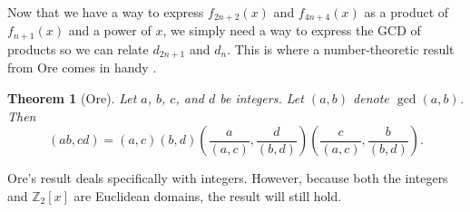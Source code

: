\documentclass[a4paper]{article}
\newtheorem{theorem}{Theorem}
\newcommand{\Z}{\mathbb{Z}}
\begin{document}
	Now that we have a way to express $f_{2n+2}(x)$ and $f_{4n+4}(x)$ as a product of $f_{n+1}(x)$ and a power of $x$, we simply need a way to express the GCD of products so we can relate $d_{2n+1}$ and $d_n$.
	This is where a number-theoretic result from Ore comes in handy \cite{ore_number_theory}.
	
	\begin{theorem}[Ore]\label{Ore_gcd}
		Let $a$, $b$, $c$, and $d$ be integers.
		Let $(a,b)$ denote $\gcd{(a,b)}$.
		Then
		\begin{equation*}
			(ab,cd) = (a,c)(b,d)\left(\frac{a}{(a,c)},\frac{d}{(b,d)}\right)\left(\frac{c}{(a,c)},\frac{b}{(b,d)}\right).
		\end{equation*}
	\end{theorem}

	Ore's result deals specifically with integers.
	However, because both the integers and $\Z_2[x]$ are Euclidean domains, the result will still hold.
\end{document}
